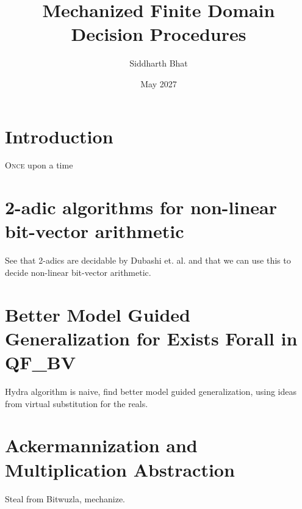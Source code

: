 \documentclass[withindex,glossary]{cam-thesis}
\title{Mechanized  Finite Domain Decision Procedures}
\author{Siddharth Bhat}
\date{May 2027}
\begin{document}
\frontmatter{}



\chapter{Introduction}

\lettrine{O}{nce} upon a time
% 
% 
 

\chapter{2-adic algorithms for non-linear bit-vector arithmetic}

See that 2-adics are decidable by Dubashi et. al. and that we can use this to
decide non-linear bit-vector arithmetic.

\chapter{Better Model Guided Generalization for Exists Forall in QF\_BV}

Hydra algorithm is naive, find better model guided generalization,
using ideas from virtual substitution for the reals.

\chapter{Ackermannization and Multiplication Abstraction}
Steal from Bitwuzla, mechanize.
\end{document}
